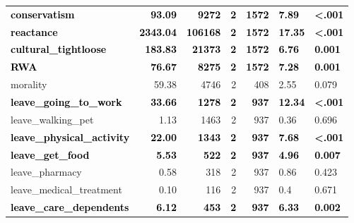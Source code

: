 \documentclass[]{article}
\begin{document}
\begin{table}[H]
\begin{tabular}[t]{lrrrrll}
\addlinespace
\textcolor{black}{\textbf{conservatism}} & \textcolor{black}{\textbf{93.09}} & \textcolor{black}{\textbf{9272}} & \textcolor{black}{\textbf{2}} & \textcolor{black}{\textbf{1572}} & \textcolor{black}{\textbf{7.89}} & \textcolor{black}{\textbf{<.001}}\\
\textcolor{black}{\textbf{reactance}} & \textcolor{black}{\textbf{2343.04}} & \textcolor{black}{\textbf{106168}} & \textcolor{black}{\textbf{2}} & \textcolor{black}{\textbf{1572}} & \textcolor{black}{\textbf{17.35}} & \textcolor{black}{\textbf{<.001}}\\
\textcolor{black}{\textbf{cultural\_tightloose}} & \textcolor{black}{\textbf{183.83}} & \textcolor{black}{\textbf{21373}} & \textcolor{black}{\textbf{2}} & \textcolor{black}{\textbf{1572}} & \textcolor{black}{\textbf{6.76}} & \textcolor{black}{\textbf{0.001}}\\
\textcolor{black}{\textbf{RWA}} & \textcolor{black}{\textbf{76.67}} & \textcolor{black}{\textbf{8275}} & \textcolor{black}{\textbf{2}} & \textcolor{black}{\textbf{1572}} & \textcolor{black}{\textbf{7.28}} & \textcolor{black}{\textbf{0.001}}\\
morality & 59.38 & 4746 & 2 & 408 & 2.55 & 0.079\\
\addlinespace
\textcolor{black}{\textbf{leave\_going\_to\_work}} & \textcolor{black}{\textbf{33.66}} & \textcolor{black}{\textbf{1278}} & \textcolor{black}{\textbf{2}} & \textcolor{black}{\textbf{937}} & \textcolor{black}{\textbf{12.34}} & \textcolor{black}{\textbf{<.001}}\\
leave\_walking\_pet & 1.13 & 1463 & 2 & 937 & 0.36 & 0.696\\
\textcolor{black}{\textbf{leave\_physical\_activity}} & \textcolor{black}{\textbf{22.00}} & \textcolor{black}{\textbf{1343}} & \textcolor{black}{\textbf{2}} & \textcolor{black}{\textbf{937}} & \textcolor{black}{\textbf{7.68}} & \textcolor{black}{\textbf{<.001}}\\
\textcolor{black}{\textbf{leave\_get\_food}} & \textcolor{black}{\textbf{5.53}} & \textcolor{black}{\textbf{522}} & \textcolor{black}{\textbf{2}} & \textcolor{black}{\textbf{937}} & \textcolor{black}{\textbf{4.96}} & \textcolor{black}{\textbf{0.007}}\\
leave\_pharmacy & 0.58 & 318 & 2 & 937 & 0.86 & 0.423\\
\addlinespace
leave\_medical\_treatment & 0.10 & 116 & 2 & 937 & 0.4 & 0.671\\
\textcolor{black}{\textbf{leave\_care\_dependents}} & \textcolor{black}{\textbf{6.12}} & \textcolor{black}{\textbf{453}} & \textcolor{black}{\textbf{2}} & \textcolor{black}{\textbf{937}} & \textcolor{black}{\textbf{6.33}} & \textcolor{black}{\textbf{0.002}}\\

\end{tabular}
\end{table}
\end{document}
